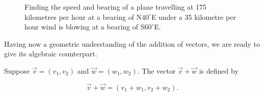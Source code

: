 \begin{example}
\begin{figure}[H]
\centering
\centerline{
\hspace{0.1cm}
}
\caption{Finding the speed and bearing of a plane travelling at 175 kilometres per hour at a  bearing of  N$40^{\circ}$E under a 35 kilometre per hour wind is blowing at a bearing of S$60^{\circ}$E. }

\end{figure}


\end{example}

Having now a geometric understanding of the addition of vectors, we are ready to give its algebraic counterpart.

\begin{definition} \label{vectoradd} 
 Suppose $\vec{v} = \left(v_1,v_2\right)$ and $\vec{w} = \left(w_1,w_2\right)$.  The vector $\vec{v} + \vec{w}$ is defined by 

\[ \vec{v} + \vec{w}  = \left( v_1 + w_1, v_2 + w_2 \right). \]


\end{definition}


